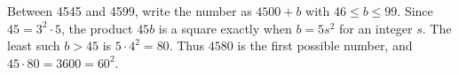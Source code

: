 Between 4545 and 4599, write the number as $4500+b$ with $46\le b\le99$. Since $45=3^2\cdot5$, the product $45b$ is a square exactly when $b=5s^2$ for an integer $s$. The least such $b>45$ is $5\cdot4^2=80$. Thus $\boxed{4580}$ is the first possible number, and $45\cdot80=3600=60^2$.
